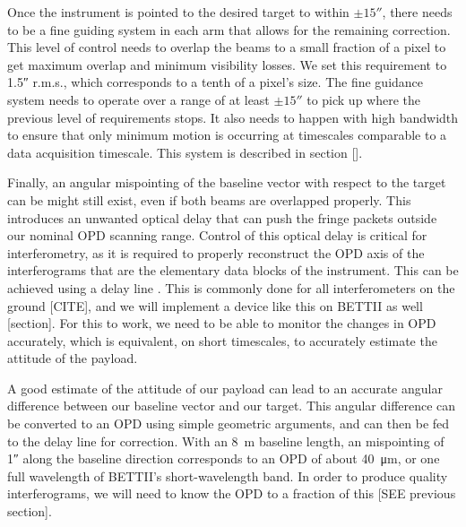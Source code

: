Once the instrument is pointed to the desired target to within $\pm\ang{;;15}$, there needs to be a fine guiding system in each arm that allows for the remaining correction. This level of control needs to overlap the beams to a small fraction of a pixel to get maximum overlap and minimum visibility losses. We set this requirement to \ang{;;1.5} r.m.s., which corresponds to a tenth of a pixel's size. The fine guidance system needs to operate over a range of at least $\pm\ang{;;15}$ to pick up where the previous level of requirements stops. It also needs to happen with high bandwidth to ensure that only minimum motion is occurring at timescales comparable to a data acquisition timescale. This system is described in section [].

Finally, an angular mispointing of the baseline vector with respect to the target can be might still exist, even if both beams are overlapped properly. This introduces an unwanted optical delay that can push the fringe packets outside our nominal OPD scanning range. Control of this optical delay is critical for interferometry, as it is required to properly reconstruct the OPD axis of the interferograms that are the elementary data blocks of the instrument. This can be achieved using a delay line . This is commonly done for all interferometers on the ground [CITE], and we will implement a device like this on BETTII as well [section]. For this to work, we need to be able to monitor the changes in OPD accurately, which is equivalent, on short timescales, to accurately estimate the attitude of the payload.


%	
%

A good estimate of the attitude of our payload can lead to an accurate angular difference between our baseline vector and our target. This angular difference can be converted to an OPD using simple geometric arguments, and can then be fed to the delay line for correction. With an 8~m baseline length, an mispointing of \ang{;;1} along the baseline direction corresponds to an OPD of about \SI{40}{\um}, or one full wavelength of BETTII's short-wavelength band. In order to produce quality interferograms, we will need to know the OPD to a fraction of this [SEE previous section]. 


